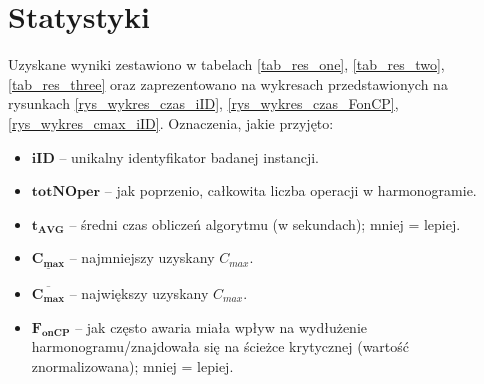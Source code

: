 \documentclass[archivemode]{mgr}
\begin{document}
\section{Statystyki}
Uzyskane wyniki zestawiono w tabelach \ref{tab_res_one}, \ref{tab_res_two}, \ref{tab_res_three} oraz zaprezentowano na wykresach przedstawionych na rysunkach \ref{rys_wykres_czas_iID}, \ref{rys_wykres_czas_FonCP}, \ref{rys_wykres_cmax_iID}. Oznaczenia, jakie przyjęto:
\begin{itemize}
	\item $\mathbf{iID}$ -- unikalny identyfikator badanej instancji.
	\item $\mathbf{totNOper}$ -- jak poprzenio, całkowita liczba operacji w harmonogramie.
	\item $\mathbf{t_{AVG}}$ -- średni czas obliczeń algorytmu (w sekundach); mniej = lepiej.
	\item $\mathbf{\underline{C_{max}}}$ -- najmniejszy uzyskany $C_{max}$.
	\item $\mathbf{\overline{C_{max}}}$ -- największy uzyskany $C_{max}$.
	\item $\mathbf{F_{onCP}}$ -- jak często awaria miała wpływ na wydłużenie harmonogramu/znajdowała się na ścieżce krytycznej (wartość znormalizowana); mniej = lepiej.
\end{itemize}
\end{document}
